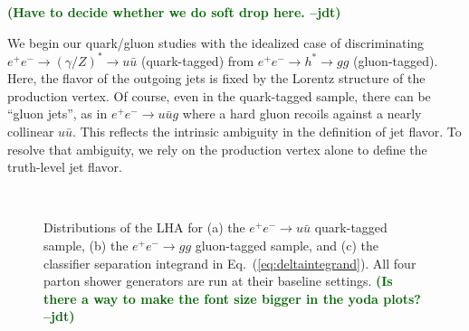 \documentclass[11pt,letterpaper]{article}
\DeclareRobustCommand{\Eq}[1]{Eq.~(\ref{#1})}
\newcommand{\jdt}[1]{\textbf{\textcolor{darkgreen}{(#1 --jdt)}}}
\begin{document}
\jdt{Have to decide whether we do soft drop here.}

We begin our quark/gluon studies with the idealized case of discriminating $e^+ e^- \to (\gamma/Z)^* \to u \bar{u}$ (quark-tagged) from $e^+ e^- \to h^* \to gg$ (gluon-tagged).  Here, the flavor of the outgoing jets is fixed by the Lorentz structure of the production vertex.  Of course, even in the quark-tagged sample, there can be ``gluon jets'', as in $e^+ e^- \to u \bar{u} g$ where a hard gluon recoils against a nearly collinear $u \bar{u}$.  This reflects the intrinsic ambiguity in the definition of jet flavor.   To resolve that ambiguity, we rely on the production vertex alone to define the truth-level jet flavor.

\begin{figure}
\centering
{}
$\quad$
$\quad$
\caption{Distributions of the LHA for (a) the $e^+ e^- \to u \bar{u}$ quark-tagged sample, (b) the $e^+ e^- \to gg$ gluon-tagged sample, and (c) the classifier separation integrand in \Eq{eq:deltaintegrand}.  All four parton shower generators are run at their baseline settings.  \jdt{Is there a way to make the font size bigger in the yoda plots?}}
\label{fig:LHA_hadron}
\end{figure}
\end{document}
